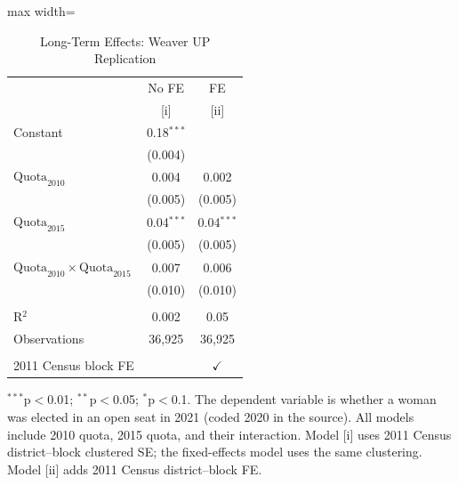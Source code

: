 
\begin{table}[htbp]
   \centering
   \scriptsize
   \begin{adjustbox}{max width=\linewidth}
      \begin{threeparttable}[b]
         \caption{\label{tab:weaver_long} Long-Term Effects: Weaver UP Replication}
         \bigskip
         \begin{tabular}{lcc}
            \toprule
                                                                & No FE        & FE \\   
                                                                & [i]          & [ii]\\  
            \midrule 
            Constant                                            & 0.18$^{***}$ &   \\   
                                                                & (0.004)      &   \\   
            $\text{Quota}_{2010}$                               & 0.004        & 0.002\\   
                                                                & (0.005)      & (0.005)\\   
            $\text{Quota}_{2015}$                               & 0.04$^{***}$ & 0.04$^{***}$\\   
                                                                & (0.005)      & (0.005)\\   
            $\text{Quota}_{2010} \times \text{Quota}_{2015}$    & 0.007        & 0.006\\   
                                                                & (0.010)      & (0.010)\\   
             \\
            R$^2$                                               & 0.002        & 0.05\\  
            Observations                                        & 36,925       & 36,925\\  
             \\
            2011 Census block FE                                &              & $\checkmark$\\   
            \bottomrule
         \end{tabular}
         
         \begin{tablenotes}
            \item $^{***}$p$<$0.01; $^{**}$p$<$0.05; $^{*}$p$<$0.1. The dependent variable is whether a woman was elected in an open seat in 2021 (coded 2020 in the source). All models include 2010 quota, 2015 quota, and their interaction. Model [i] uses 2011 Census district--block clustered SE; the fixed-effects model uses the same clustering. Model [ii] adds 2011 Census district--block FE.
         \end{tablenotes}
      \end{threeparttable}
   \end{adjustbox}
\end{table}


